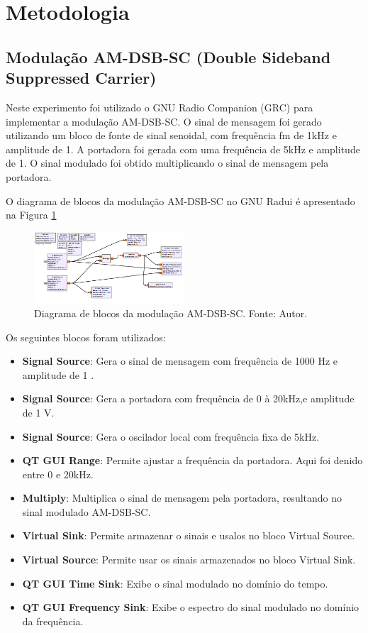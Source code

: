 \section{Metodologia}

\subsection{Modulação AM-DSB-SC (Double Sideband Suppressed Carrier)}

Neste experimento foi utilizado o GNU Radio Companion (GRC) para implementar a modulação AM-DSB-SC. O sinal de mensagem foi gerado utilizando um bloco de fonte de sinal senoidal, com frequência fm de 1kHz e amplitude de 1. A portadora foi gerada com uma frequência de 5kHz e amplitude de 1. O sinal modulado foi obtido multiplicando o sinal de mensagem pela portadora.

O diagrama de blocos da modulação AM-DSB-SC no GNU Radui é apresentado na Figura \ref{fig:modulacao_am_sc}
\begin{figure}
    \centering
    \includegraphics[width=0.5\textwidth]{images/modulacao_gnu_am_dsb_sc.png}
    \caption{Diagrama de blocos da modulação AM-DSB-SC. Fonte: Autor.}
    \label{fig:modulacao_am_sc}
\end{figure}

Os seguintes blocos foram utilizados:

\begin{itemize}
    \item \textbf{Signal Source}: Gera o sinal de mensagem com frequência de 1000 Hz e amplitude de 1 .
    \item \textbf{Signal Source}: Gera a portadora com frequência de 0 à 20kHz,e amplitude de 1 V.
    \item \textbf{Signal Source}: Gera o oscilador local com frequência fixa de 5kHz.
    \item \textbf{QT GUI Range}: Permite ajustar a frequência da portadora. Aqui foi denido entre 0 e 20kHz.
    \item \textbf{Multiply}: Multiplica o sinal de mensagem pela portadora, resultando no sinal modulado AM-DSB-SC.
    \item \textbf{Virtual Sink}: Permite armazenar o sinais e usalos no bloco Virtual Source.
    \item \textbf{Virtual Source}: Permite usar os sinais armazenados no bloco Virtual Sink.
    \item \textbf{QT GUI Time Sink}: Exibe o sinal modulado no domínio do tempo.
    \item \textbf{QT GUI Frequency Sink}: Exibe o espectro do sinal modulado no domínio da frequência.
\end{itemize}



